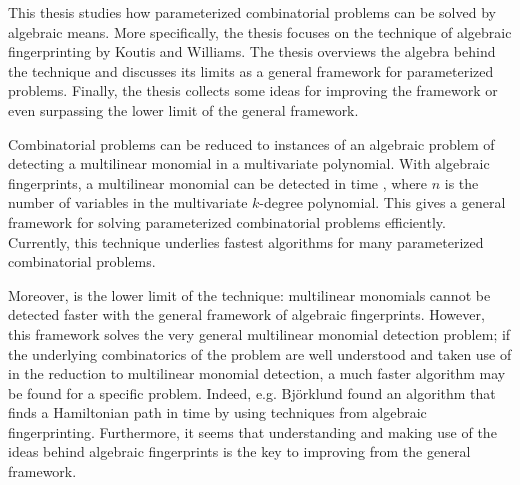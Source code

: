 %
%
\begin{enabstract}
  This thesis studies how parameterized combinatorial problems can be 
  solved %
  by algebraic means. More specifically, the thesis focuses on the technique 
  of algebraic fingerprinting by Koutis and Williams. The thesis 
  overviews the algebra behind the technique and discusses its limits 
  as a general framework for parameterized problems. 
  Finally, the thesis collects some ideas 
  for improving the framework or even surpassing the lower limit of the 
  general framework.

  Combinatorial problems can be reduced to instances of an algebraic problem 
  of detecting a multilinear monomial in a multivariate polynomial. 
  With algebraic fingerprints, a multilinear monomial can be detected 
  in time , where $n$ is the number of variables in the 
  multivariate $k$-degree polynomial. This gives a general framework for solving parameterized 
  combinatorial problems efficiently. 
  Currently, this technique underlies fastest algorithms 
  for many parameterized combinatorial problems. 

  Moreover,  is the lower limit of the technique: 
  multilinear monomials cannot be detected faster 
  with the general framework of algebraic fingerprints. 
  However, this framework solves the very general multilinear monomial 
  detection problem; if the underlying combinatorics of the problem are well understood 
  and taken use of in the reduction to multilinear monomial detection, 
  a much faster algorithm may be 
  found for a specific problem. Indeed, e.g. 
  Björklund found an algorithm that 
  finds a Hamiltonian path in time  by 
  using techniques from algebraic fingerprinting. Furthermore, 
  it seems that understanding and making use of the ideas behind algebraic fingerprints 
  is the key to improving from the general framework.
%
\end{enabstract}
